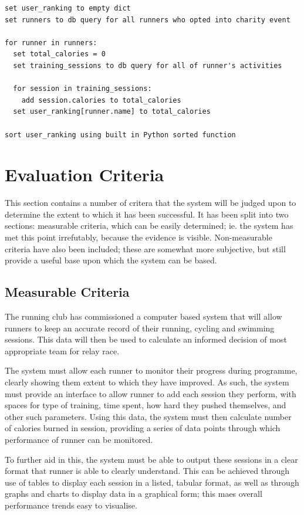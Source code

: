\documentclass{article}[12pt,a4paper]
\begin{document}
\begin{verbatim}
set user_ranking to empty dict
set runners to db query for all runners who opted into charity event

for runner in runners:
  set total_calories = 0
  set training_sessions to db query for all of runner's activities

  for session in training_sessions:
    add session.calories to total_calories
  set user_ranking[runner.name] to total_calories

sort user_ranking using built in Python sorted function
\end{verbatim}

 
\section{Evaluation Criteria}
This section contains a number of critera that the system will be judged upon to determine the extent to which it has been successful. It has been split into two sections: measurable criteria, which can be easily determined; ie. the system has met this point irrefutably, because the evidence is visible. Non-measurable criteria have also been included; these are somewhat more subjective, but still provide a useful base upon which the system can be based.

\subsection{Measurable Criteria}
The running club has commissioned  a computer based system that will allow runners to keep an accurate record of their running, cycling and swimming sessions. This data will then be used to calculate an informed decision of most appropriate team for relay race.

The system must allow each runner to monitor their progress during programme, clearly showing them extent to which they have improved. As such, the system must provide an interface to allow runner to add each session they perform, with spaces for type of training, time spent, how hard they pushed themselves, and other such parameters. Using this data, the system must then calculate number of calories burned in session, providing a series of data points through which performance of runner can be monitored.

To further aid in this, the system must be able to output these sessions in a clear format that runner is able to clearly understand. This can be achieved through use of tables to display each session in a listed, tabular format, as well as through graphs and charts to display data in a graphical form; this maes overall performance trends easy to visualise.
\end{document}
